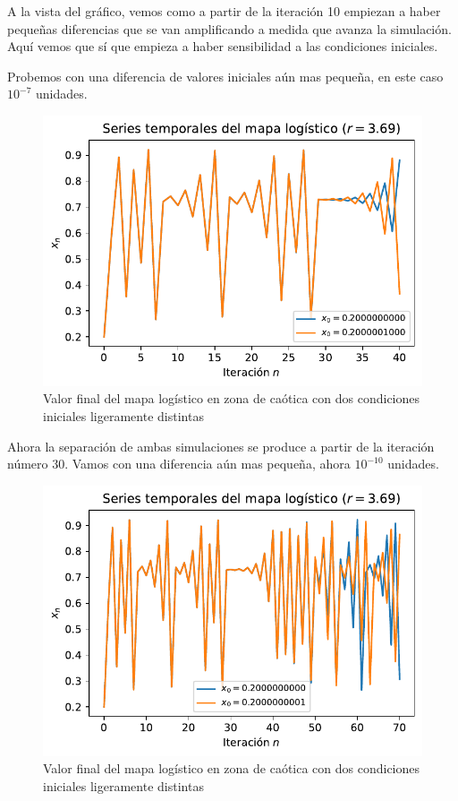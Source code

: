 \documentclass[
  10pt,
  a4paper,
  DIV=11,
  numbers=noendperiod,
  open=any]{scrreprt}
\numberwithin{equation}{chapter}
\numberwithin{equation}{section}
\renewcommand{\[}{\begin{equation}}
\renewcommand{\]}{\end{equation}}
\begin{document}
A la vista del gráfico, vemos como a partir de la iteración 10 empiezan
a haber pequeñas diferencias que se van amplificando a medida que avanza
la simulación. Aquí vemos que sí que empieza a haber sensibilidad a las
condiciones iniciales.

Probemos con una diferencia de valores iniciales aún mas pequeña, en
este caso \(10^{-7}\) unidades.

\begin{figure}[h]
  \centering
  \includegraphics[keepaspectratio]{01-logistica/lyapunov_files/figure-pdf/cell-5-output-1.pdf}
  \caption{Valor final del mapa logístico en zona de caótica con dos condiciones iniciales ligeramente distintas}
\end{figure}    

Ahora la separación de ambas simulaciones se produce a partir de la
iteración número 30. Vamos con una diferencia aún mas pequeña, ahora
\(10^{-10}\) unidades.

\begin{figure}[h]
  \centering
  \includegraphics[keepaspectratio]{01-logistica/lyapunov_files/figure-pdf/cell-6-output-1.pdf}
  \caption{Valor final del mapa logístico en zona de caótica con dos condiciones iniciales ligeramente distintas}
\end{figure}  
\end{document}
